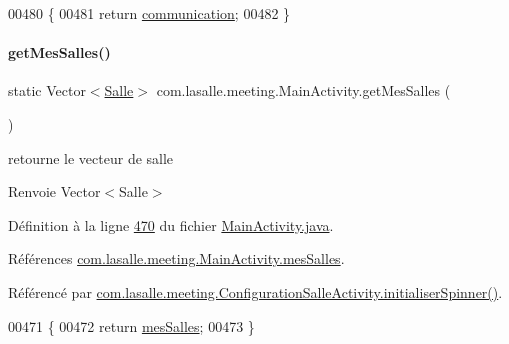 \begin{DoxyCode}
00480     \{
00481         \textcolor{keywordflow}{return} \hyperlink{classcom_1_1lasalle_1_1meeting_1_1_main_activity_a6a358d10ba0f56af3b548e41902db273}{communication};
00482     \}
\end{DoxyCode}
\mbox{\label{classcom_1_1lasalle_1_1meeting_1_1_main_activity_a67d3733d9841e19aae3b52299844bb06}} 
\paragraph{\texorpdfstring{get\+Mes\+Salles()}{getMesSalles()}}
{\footnotesize\ttfamily static Vector$<$\hyperlink{classcom_1_1lasalle_1_1meeting_1_1_salle}{Salle}$>$ com.\+lasalle.\+meeting.\+Main\+Activity.\+get\+Mes\+Salles (\begin{DoxyParamCaption}{ }\end{DoxyParamCaption})\hspace{0.3cm}{\ttfamily [static]}}



retourne le vecteur de salle 

\begin{DoxyReturn}{Renvoie}
Vector$<$\+Salle$>$ 
\end{DoxyReturn}


Définition à la ligne \hyperlink{_main_activity_8java_source_l00470}{470} du fichier \hyperlink{_main_activity_8java_source}{Main\+Activity.\+java}.



Références \hyperlink{_main_activity_8java_source_l00061}{com.\+lasalle.\+meeting.\+Main\+Activity.\+mes\+Salles}.



Référencé par \hyperlink{_configuration_salle_activity_8java_source_l00100}{com.\+lasalle.\+meeting.\+Configuration\+Salle\+Activity.\+initialiser\+Spinner()}.


\begin{DoxyCode}
00471     \{
00472         \textcolor{keywordflow}{return} \hyperlink{classcom_1_1lasalle_1_1meeting_1_1_main_activity_ab13e34516d877abc3ba937505b441979}{mesSalles};
00473     \}
\end{DoxyCode}
\mbox{\label{classcom_1_1lasalle_1_1meeting_1_1_main_activity_a0c5fe341f52a9db09401885878883663}} 
